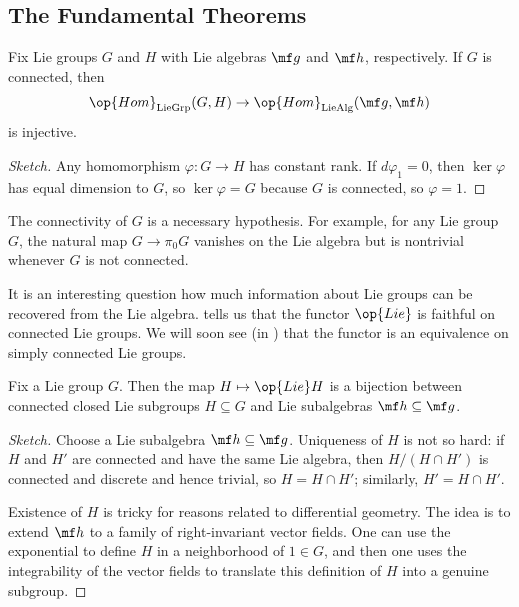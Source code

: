 \documentclass{article}
\begin{document}
\subsection{The Fundamental Theorems} \label{subsec:lie-theorems}
\begin{proposition} \label{prop:lie-is-faithful}
	Fix Lie groups $G$ and $H$ with Lie algebras $\mf g$ and $\mf h$, respectively. If $G$ is connected, then
	\[\op{Hom}_{\mathrm{LieGrp}}(G,H)\to\op{Hom}_{\mathrm{LieAlg}}(\mf g,\mf h)\]
	is injective.
\end{proposition}
\begin{proof}[Sketch]
	Any homomorphism $\varphi\colon G\to H$ has constant rank. If $d\varphi_1=0$, then $\ker\varphi$ has equal dimension to $G$, so $\ker\varphi=G$ because $G$ is connected, so $\varphi=1$.
\end{proof}
\begin{example}
	The connectivity of $G$ is a necessary hypothesis. For example, for any Lie group $G$, the natural map $G\to\pi_0G$ vanishes on the Lie algebra but is nontrivial whenever $G$ is not connected.
\end{example}
\begin{remark}
	It is an interesting question how much information about Lie groups can be recovered from the Lie algebra.  tells us that the functor $\op{Lie}$ is faithful on connected Lie groups. We will soon see (in ) that the functor is an equivalence on simply connected Lie groups.
\end{remark}
\begin{theorem} \label{thm:lie-1}
	Fix a Lie group $G$. Then the map $H\mapsto\op{Lie}H$ is a bijection between connected closed Lie subgroups $H\subseteq G$ and Lie subalgebras $\mf h\subseteq\mf g$.
\end{theorem}
\begin{proof}[Sketch]
	Choose a Lie subalgebra $\mf h\subseteq\mf g$. Uniqueness of $H$ is not so hard: if $H$ and $H'$ are connected and have the same Lie algebra, then $H/(H\cap H')$ is connected and discrete and hence trivial, so $H=H\cap H'$; similarly, $H'=H\cap H'$.

	Existence of $H$ is tricky for reasons related to differential geometry. The idea is to extend $\mf h$ to a family of right-invariant vector fields. One can use the exponential to define $H$ in a neighborhood of $1\in G$, and then one uses the integrability of the vector fields to translate this definition of $H$ into a genuine subgroup.
\end{proof}
\end{document}
